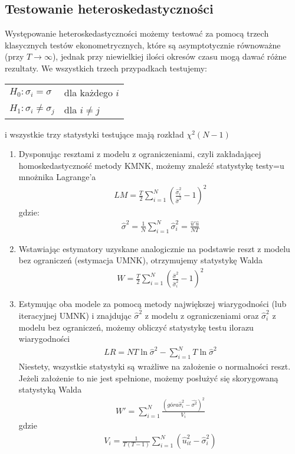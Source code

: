 \subsection{Testowanie heteroskedastyczności}
Występowanie heteroskedastyczności możemy testować za pomocą trzech klasycznych testów ekonometrycznych, które są asymptotycznie równoważne (przy $ T\to \infty  $), jednak przy niewielkiej ilości okresów czasu mogą dawać różne rezultaty. We wszystkich trzech przypadkach testujemy:
\begin{center}
\begin{tabular}{ll}
$ H_0:\sigma_i=\sigma  $ & dla każdego $ i $\\
$ H_1:\sigma_i\neq\sigma_j  $ & dla $ i\neq j $
\end{tabular}
\end{center}
i wszystkie trzy statystyki testujące mają rozkład $ \chi^2(N-1) $
\begin{enumerate}
\item Dysponując resztami z modelu z ograniczeniami, czyli zakładającej homoskedastyczność metody KMNK, możemy znaleźć statystykę testy=u mnożnika Lagrange'a
\begin{gather*}
LM=\frac{T}{2}\sum_{i=1}^{N}\left(\frac{\hat \sigma _i^2}{\hat \sigma^2}-1\right)^2
\end{gather*}
gdzie:
\begin{gather*}
\hat \sigma ^2=\frac{1}{N}\sum_{i=1}^{N}\hat \sigma ^2_i=\frac{\hat u'\hat u}{NT}
\end{gather*}
\item Wstawiając estymatory uzyskane analogicznie na podstawie reszt z modelu bez ograniczeń (estymacja UMNK), otrzymujemy statystykę Walda
\begin{gather*}
W=\frac{T}{2}\sum_{i=1}^{N}\left(\frac{\hat \sigma ^2}{\hat \sigma_i^2}-1\right)^2
\end{gather*}
\item Estymując oba modele za pomocą metody największej wiarygodności (lub iteracyjnej UMNK) i znajdując $ \hat \sigma ^2 $ z modelu z ograniczeniami oraz $ \hat \sigma _i^2 $ z modelu bez ograniczeń, możemy obliczyć statystykę testu ilorazu wiarygodności
\begin{gather*}
LR= NT\ln \hat \sigma ^2-\sum_{i=1}^{N}T\ln \hat \sigma ^2
\end{gather*}
Niestety, wszystkie statystyki są wrażliwe na założenie o normalności reszt. Jeżeli założenie to nie jest spełnione, możemy posłużyć się skorygowaną statystyką Walda
\begin{gather*}
W'=\sum_{i=1}^{N}\frac{\left(góra\hat \sigma_i^2-\hat{\sigma ^2}\right)^2}{V_i}
\end{gather*}
gdzie
\begin{gather*}
V_i=\frac{1}{T(T-1)}\sum_{i=1}^{N}\left(\hat u_{it}^2-\hat \sigma _i^2\right)
\end{gather*}
\end{enumerate}
